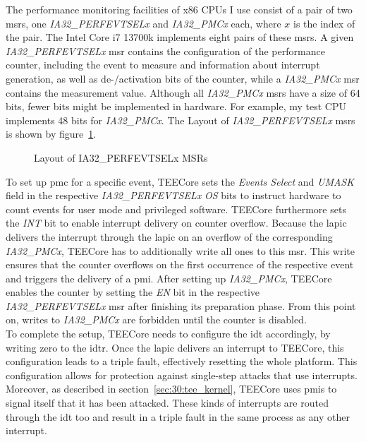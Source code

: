 The performance monitoring facilities of x86 CPUs I use consist of a pair of two
\glspl{msr}, one \textit{IA32\_PERFEVTSELx} and \textit{IA32\_PMCx} each, where
$x$ is the index of the pair. The Intel Core i7 13700k implements eight pairs of
these \glspl{msr}. A given \textit{IA32\_PERFEVTSELx} \gls{msr} contains the
configuration of the performance counter, including the event to measure and
information about interrupt generation, as well as de-/activation bits of the
counter, while a \textit{IA32\_PMCx} \gls{msr} contains the measurement value.
Although all \textit{IA32\_PMCx} \glspl{msr} have a size of 64 bits, fewer
bits might be implemented in hardware. For example, my test CPU implements 48
bits for \textit{IA32\_PMCx}. The Layout of \textit{IA32\_PERFEVTSELx}
\glspl{msr} is shown by figure~\ref{fig:state:technical:perfsel}.

\begin{center}
  \begin{figure}
    \centering
    
    \caption{Layout of IA32\_PERFEVTSELx MSRs}
    \label{fig:state:technical:perfsel}
  \end{figure}
\end{center}

To set up \gls{pmc} for a specific event, TEECore sets the \textit{Events
Select} and \textit{UMASK} field in the respective \textit{IA32\_PERFEVTSELx}
\textit{OS} bits to instruct hardware to count events for user mode and
privileged software. TEECore furthermore sets the \textit{INT} bit to enable
interrupt delivery on counter overflow. Because the \gls{lapic} delivers the
interrupt through the \gls{lapic} on an overflow of the corresponding
\textit{IA32\_PMCx}, TEECore has to additionally write all ones to this
\gls{msr}. This write ensures that the counter overflows on the first
occurrence of the respective event and triggers the delivery of a \gls{pmi}.
After setting up \textit{IA32\_PMCx}, TEECore enables the counter by setting
the \textit{EN} bit in the respective \textit{IA32\_PERFEVTSELx} \gls{msr}
after finishing its preparation phase. From this point on, writes to
\textit{IA32\_PMCx} are forbidden until the counter is disabled.\\

To complete the setup, TEECore needs to configure the \gls{idt} accordingly, by
writing zero to the \gls{idtr}. Once the \gls{lapic} delivers an interrupt to
TEECore, this configuration leads to a triple fault, effectively resetting the
whole platform. This configuration allows for protection against single-step
attacks that use interrupts. Moreover, as described in
section~\ref{sec:30:tee_kernel}, TEECore uses \glspl{pmi} to signal itself that
it has been attacked. These kinds of interrupts are routed through the \gls{idt}
too and result in a triple fault in the same process as any other interrupt.\\

